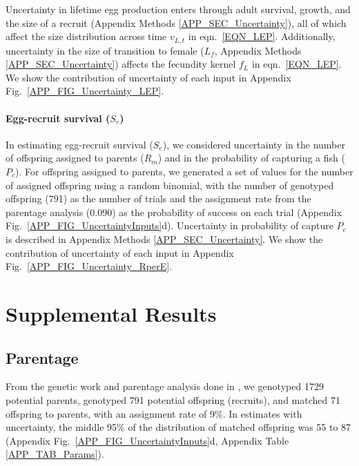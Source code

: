\documentclass[12pt, oneside]{article}   	%
\begin{document}
Uncertainty in lifetime egg production enters through adult survival, growth, and the size of a recruit (Appendix Methods \ref{APP_SEC_Uncertainty}), all of which affect the size distribution across time $v_{L,t}$ in eqn.\ \ref{EQN_LEP}. Additionally, uncertainty in the size of transition to female ($L_f$, Appendix Methods \ref{APP_SEC_Uncertainty}) affects the fecundity kernel $f_L$ in eqn.\ \ref{EQN_LEP}. We show the contribution of uncertainty of each input in Appendix Fig.\ \ref{APP_FIG_Uncertainty_LEP}.

\paragraph*{Egg-recruit survival ($S_e$)} 

In estimating egg-recruit survival ($S_e$), we considered uncertainty in the number of offspring assigned to parents ($R_m$) and in the probability of capturing a fish ($P_c$). For offspring assigned to parents, we generated a set of values for the number of assigned offspring using a random binomial, with the number of genotyped offspring (791) as the number of trials and the assignment rate from the parentage analysis (0.090) as the probability of success on each trial \citep{catalanoInPrepconnectivity} (Appendix Fig.\ \ref{APP_FIG_UncertaintyInputs}d). Uncertainty in probability of capture $P_c$ is described in Appendix Methods \ref{APP_SEC_Uncertainty}. We show the contribution of uncertainty of each input in Appendix Fig.\ \ref{APP_FIG_Uncertainty_RperE}.

\newpage{}

\section{Supplemental Results} \label{APP_SEC_RESULTS} 

\subsection{Parentage} \label{APP_SEC_RESULTS_Parentage}

From the genetic work and parentage analysis done in \cite{catalanoInPrepconnectivity}, we genotyped 1729 potential parents, genotyped 791 potential offspring (recruits), and matched 71 offspring to parents, with an assignment rate of 9\%. In estimates with uncertainty, the middle 95\% of the distribution of matched offspring was 55 to 87 (Appendix Fig.\ \ref{APP_FIG_UncertaintyInputs}d, Appendix Table \ref{APP_TAB_Params}).
\end{document}
